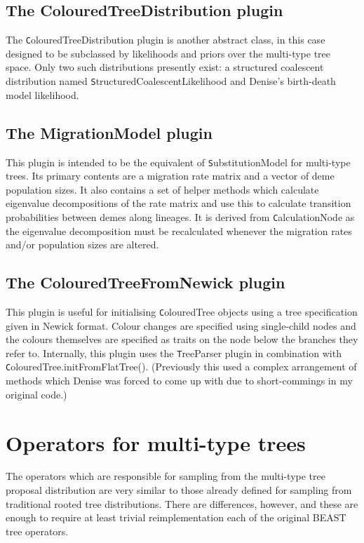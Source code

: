 \documentclass[a4paper,11pt]{article}
\newcommand{\class}[1]{{\texttt #1}}
\begin{document}
\subsection{The ColouredTreeDistribution plugin}

The \class{ColouredTreeDistribution} plugin is another abstract class,
in this case designed to be subclassed by likelihoods and priors over
the multi-type tree space.  Only two such distributions presently
exist: a structured coalescent distribution named
\class{StructuredCoalescentLikelihood} and Denise's birth-death model
likelihood.

\subsection{The MigrationModel plugin}

This plugin is intended to be the equivalent of
\class{SubstitutionModel} for multi-type trees. Its primary contents
are a migration rate matrix and a vector of deme population sizes. It
also contains a set of helper methods which calculate eigenvalue
decompositions of the rate matrix and use this to calculate transition
probabilities between demes along lineages. It is derived from
\class{CalculationNode} as the eigenvalue decomposition must be
recalculated whenever the migration rates and/or population sizes are
altered.


\subsection{The ColouredTreeFromNewick plugin}

This plugin is useful for initialising \class{ColouredTree} objects
using a tree specification given in Newick format.  Colour changes are
specified using single-child nodes and the colours themselves are
specified as traits on the node below the branches they refer to.
Internally, this plugin uses the \class{TreeParser} plugin in
combination with \class{ColouredTree.initFromFlatTree()}.  (Previously
this used a complex arrangement of methods which Denise was forced to
come up with due to short-commings in my original code.)

\section{Operators for multi-type trees}

The operators which are responsible for sampling from the multi-type
tree proposal distribution are very similar to those already defined
for sampling from traditional rooted tree distributions.  There are
differences, however, and these are enough to require at least trivial
reimplementation each of the original BEAST tree operators.
\end{document}
